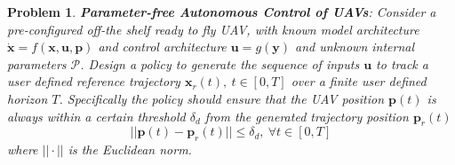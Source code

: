 \documentclass[letterpaper, 10 pt, conference]{ieeeconf}  %
\newtheorem{problem}{Problem}
\begin{document}
\begin{problem}
 \textbf{\textit{Parameter-free Autonomous Control of UAVs}}: 
Consider a pre-configured off-the shelf ready to fly UAV, with known model architecture $\dot{\bm{x}}=f(\bm{x},\bm{u},\bm{p})$ and control architecture $\bm{u}=g(\bm{y})$ and unknown internal parameters $\mathcal{P}$. Design a policy to generate the sequence of inputs $\bm{u}$ to track a user defined reference trajectory $\bm{x}_r(t),~ t \in [0,T]$ over a finite user defined horizon $T$. Specifically the policy should ensure that the UAV position $\bm{p}(t)$ is always within a certain threshold $\delta_d$ from the generated trajectory position $\bm{p}_r(t)$
 \begin{equation} \label{eq:positlive}
        ||\bm{p}(t)-\bm{p}_r(t)|| \leq \delta_d,~\forall t \in [0,T]
    \end{equation}
    where $||\cdot||$ is the Euclidean norm.
\end{problem}
%
\end{document}
